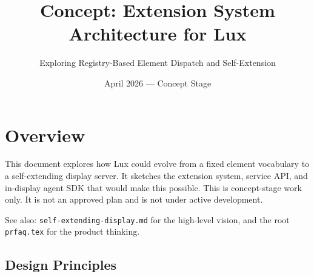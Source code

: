 \documentclass[a4paper,10pt]{article}
\begin{document}
\begin{center}
\end{center}
\vspace{0.5em}

\title{Concept: Extension System Architecture for Lux}
\author{Exploring Registry-Based Element Dispatch and Self-Extension}
\date{April 2026 --- Concept Stage}
\maketitle

\tableofcontents
\newpage

\section{Overview}

This document explores how Lux could evolve from a fixed element
vocabulary to a self-extending display server.  It sketches the
extension system, service API, and in-display agent SDK that would
make this possible.  This is concept-stage work only. It is not an
approved plan and is not under active development.

See also: \texttt{self-extending-display.md} for the
high-level vision, and the root \texttt{prfaq.tex} for the product
thinking.

\subsection{Design Principles}
\end{document}
